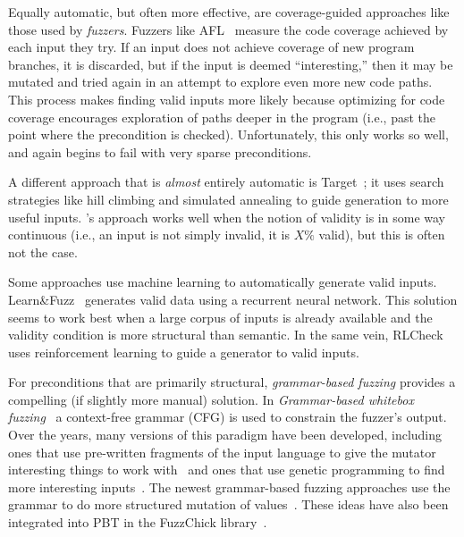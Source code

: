 Equally automatic, but often more effective, are coverage-guided approaches like
those used by {\em fuzzers}. Fuzzers like AFL~\cite{afl-readme} measure the code
coverage achieved by each input they try. If an input does not achieve coverage
of new program branches, it is discarded, but if the input is deemed
``interesting,'' then it may be mutated and tried again in an attempt to explore
even more new code paths. This process makes finding valid inputs more likely
because optimizing for code coverage encourages exploration of paths deeper in
the program (i.e., past the point where the precondition is checked).
Unfortunately, this only works so well, and again begins to fail with very
sparse preconditions.

A different approach that is {\em almost} entirely automatic is {\sc
Target}~\cite{loscher2017targetedpbt}; it uses search strategies like hill
climbing and simulated annealing to guide generation to more useful inputs.
\citeauthor{loscher2017targetedpbt}'s approach works well when the notion of
validity is in some way continuous (i.e., an input is not simply invalid, it is
$X\%$ valid), but this is often not the case.

Some approaches use machine learning to automatically generate valid inputs.
{\sc Learn\&Fuzz}~\cite{godefroid2017learn} generates valid data using a
recurrent neural network.  This solution seems to work best when a large corpus
of inputs is already available and the validity condition is more structural
than semantic. In the same vein, {\sc RLCheck}~\cite{DBLP:conf/icse/ReddyLPS20}
uses reinforcement learning to guide a generator to valid inputs.

For preconditions that are primarily structural, {\em grammar-based fuzzing}
provides a compelling (if slightly more manual) solution. In {\em
Grammar-based whitebox fuzzing}~\cite{godefroid2008grammar} a context-free
grammar (CFG) is used to constrain the fuzzer's output. Over the years, many
versions of this paradigm have been developed, including ones that use
pre-written fragments of the input language to give the mutator interesting
things to work with~\cite{holler2012fuzzing} and ones that use genetic
programming to find more interesting inputs~\cite{veggalam2016ifuzzer}. The
newest grammar-based fuzzing approaches use the grammar to do more structured
mutation of values~\cite{wang2019superion,srivastava2021gramatron}. These ideas have also been integrated
into PBT in the FuzzChick library~\cite{DBLP:journals/pacmpl/Lampropoulos0P19}.

